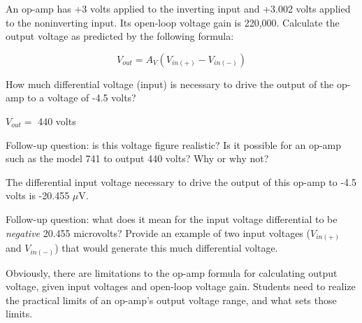 

An op-amp has +3 volts applied to the inverting input and +3.002 volts applied to the noninverting input.  Its open-loop voltage gain is 220,000.  Calculate the output voltage as predicted by the following formula:

$$V_{out} = A_V \left( V_{in(+)} - V_{in(-)} \right)$$

\vskip 10pt

How much differential voltage (input) is necessary to drive the output of the op-amp to a voltage of -4.5 volts?







$V_{out} =$ 440 volts

\vskip 10pt

Follow-up question: is this voltage figure realistic?  Is it possible for an op-amp such as the model 741 to output 440 volts?  Why or why not?

\vskip 20pt

The differential input voltage necessary to drive the output of this op-amp to -4.5 volts is -20.455 $\mu$V.

\vskip 10pt

Follow-up question: what does it mean for the input voltage differential to be {\it negative} 20.455 microvolts?  Provide an example of two input voltages ($V_{in(+)}$ and $V_{in(-)}$) that would generate this much differential voltage.







Obviously, there are limitations to the op-amp formula for calculating output voltage, given input voltages and open-loop voltage gain.  Students need to realize the practical limits of an op-amp's output voltage range, and what sets those limits.




